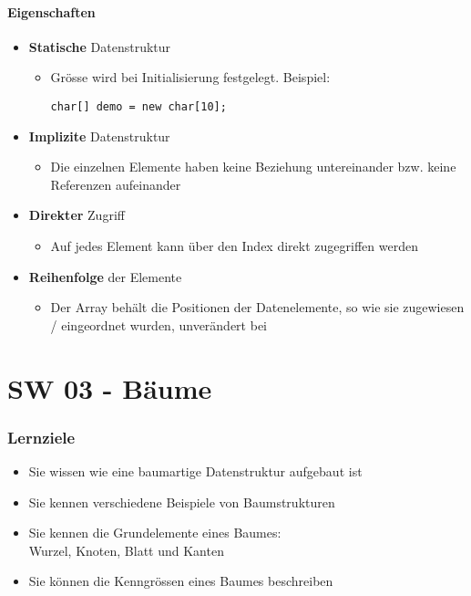 \documentclass[10pt,a4paper]{article}
\begin{document}
\subsection{Eigenschaften}
\begin{itemize}[noitemsep,topsep=0pt,leftmargin=*]
    \item \textbf{Statische} Datenstruktur
    \begin{itemize}[noitemsep,topsep=0pt,leftmargin=*]
        \item Grösse wird bei Initialisierung festgelegt. Beispiel:
        \begin{lstlisting}
char[] demo = new char[10];
        \end{lstlisting}
    \end{itemize}
    \item \textbf{Implizite} Datenstruktur
    \begin{itemize}[noitemsep,topsep=0pt,leftmargin=*]
        \item Die einzelnen Elemente haben keine Beziehung untereinander bzw. keine Referenzen aufeinander
    \end{itemize}
    \item \textbf{Direkter} Zugriff
    \begin{itemize}[noitemsep,topsep=0pt,leftmargin=*]
        \item Auf jedes Element kann über den Index direkt zugegriffen werden
    \end{itemize}
    \item \textbf{Reihenfolge} der Elemente
    \begin{itemize}[noitemsep,topsep=0pt,leftmargin=*]
        \item Der Array behält die Positionen der Datenelemente, so wie sie zugewiesen / eingeordnet wurden, unverändert bei
    \end{itemize}
\end{itemize}

\part{SW 03 - Bäume}
\section{Lernziele}
\begin{itemize}[noitemsep,topsep=0pt,leftmargin=*]
    \item Sie wissen wie eine baumartige Datenstruktur aufgebaut ist
    \item Sie kennen verschiedene Beispiele von Baumstrukturen
    \item Sie kennen die Grundelemente eines Baumes:\\
    Wurzel, Knoten, Blatt und Kanten
    \item Sie können die Kenngrössen eines Baumes beschreiben
\end{itemize}
\end{document}
